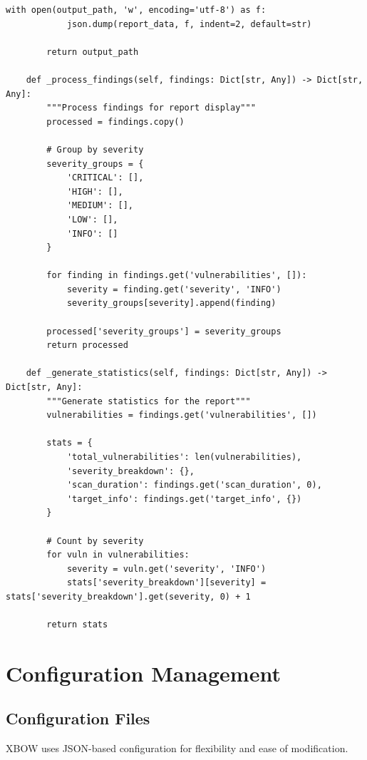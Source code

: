 \documentclass[12pt,a4paper]{report}
\begin{document}
\begin{lstlisting}[caption=Report Generator Implementation]
        with open(output_path, 'w', encoding='utf-8') as f:
            json.dump(report_data, f, indent=2, default=str)
            
        return output_path
    
    def _process_findings(self, findings: Dict[str, Any]) -> Dict[str, Any]:
        """Process findings for report display"""
        processed = findings.copy()
        
        # Group by severity
        severity_groups = {
            'CRITICAL': [],
            'HIGH': [],
            'MEDIUM': [],
            'LOW': [],
            'INFO': []
        }
        
        for finding in findings.get('vulnerabilities', []):
            severity = finding.get('severity', 'INFO')
            severity_groups[severity].append(finding)
            
        processed['severity_groups'] = severity_groups
        return processed
    
    def _generate_statistics(self, findings: Dict[str, Any]) -> Dict[str, Any]:
        """Generate statistics for the report"""
        vulnerabilities = findings.get('vulnerabilities', [])
        
        stats = {
            'total_vulnerabilities': len(vulnerabilities),
            'severity_breakdown': {},
            'scan_duration': findings.get('scan_duration', 0),
            'target_info': findings.get('target_info', {})
        }
        
        # Count by severity
        for vuln in vulnerabilities:
            severity = vuln.get('severity', 'INFO')
            stats['severity_breakdown'][severity] = stats['severity_breakdown'].get(severity, 0) + 1
            
        return stats
\end{lstlisting}

\section{Configuration Management}

\subsection{Configuration Files}

XBOW uses JSON-based configuration for flexibility and ease of modification.
\end{document}
